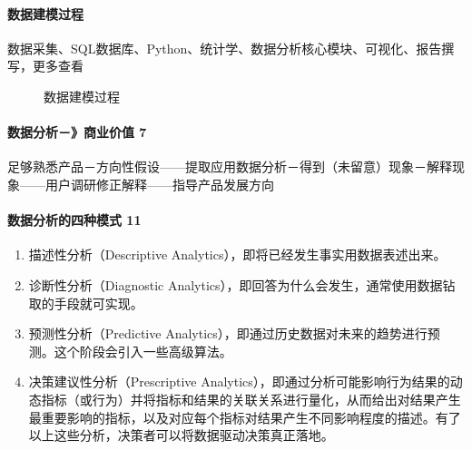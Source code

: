 \documentclass[letterpaper,10pt,english]{sphinxmanual}
\begin{document}
\paragraph{数据建模过程}
\label{\detokenize{chapter_knowledge/data_analysis:id2}}
数据采集、SQL数据库、Python、统计学、数据分析核心模块、可视化、报告撰写，更多查看%
\begin{footnote}[663]\sphinxAtStartFootnote
{}
%
\end{footnote}

\begin{figure}[H]
\centering
\capstart

\noindent{}
\caption{数据建模过程}\label{\detokenize{chapter_knowledge/data_analysis:id19}}\end{figure}


\paragraph{数据分析－》商业价值 7\sphinxfootnotemark[664]}
\label{\detokenize{chapter_knowledge/data_analysis:id3}}%
\begin{footnotetext}[664]\sphinxAtStartFootnote
{}
%
\end{footnotetext}\ignorespaces 
足够熟悉产品－方向性假设——提取应用数据分析－得到（未留意）现象－解释现象——用户调研修正解释——指导产品发展方向


\paragraph{数据分析的四种模式 11\sphinxfootnotemark[665]}
\label{\detokenize{chapter_knowledge/data_analysis:id4}}%
\begin{footnotetext}[665]\sphinxAtStartFootnote
{}
%
\end{footnotetext}\ignorespaces \begin{enumerate}
%
\item {} 
描述性分析（Descriptive Analytics），即将已经发生事实用数据表述出来。

\item {} 
诊断性分析（Diagnostic
Analytics），即回答为什么会发生，通常使用数据钻取的手段就可实现。

\item {} 
预测性分析（Predictive
Analytics），即通过历史数据对未来的趋势进行预测。这个阶段会引入一些高级算法。

\item {} 
决策建议性分析（Prescriptive
Analytics），即通过分析可能影响行为结果的动态指标（或行为）并将指标和结果的关联关系进行量化，从而给出对结果产生最重要影响的指标，以及对应每个指标对结果产生不同影响程度的描述。有了以上这些分析，决策者可以将数据驱动决策真正落地。

\end{enumerate}
\end{document}
